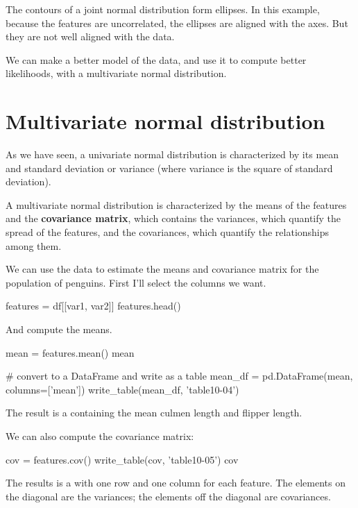 \documentclass[12pt]{book}
\theoremstyle{exercise}
\begin{document}
The contours of a joint normal distribution form ellipses.
In this example, because the features are uncorrelated, the ellipses are
aligned with the axes. But they are not well aligned with the data.

We can make a better model of the data, and use it to compute better
likelihoods, with a multivariate normal distribution.


\section{Multivariate normal distribution}
\label{multivariate-normal-distribution}

As we have seen, a univariate normal distribution is characterized by
its mean and standard deviation or variance (where variance is the
square of standard deviation).

A multivariate normal distribution is characterized by the means of the
features and the \textbf{covariance matrix}, which contains the
variances, which quantify the spread of the features, and the
covariances, which quantify the relationships among them.

We can use the data to estimate the means and covariance matrix for the
population of penguins. First I'll select the columns we want.

\begin{code}
features = df[[var1, var2]]
features.head()
\end{code}

And compute the means.

\begin{code}
mean = features.mean()
mean
\end{code}

\begin{code}
# convert to a DataFrame and write as a table
mean_df = pd.DataFrame(mean, columns=['mean'])
write_table(mean_df, 'table10-04')
\end{code}

The result is a  containing the mean
culmen length and flipper length.

We can also compute the covariance matrix:

\begin{code}
cov = features.cov()
write_table(cov, 'table10-05')
cov
\end{code}

The results is a  with one row and
one column for each feature. The elements on the diagonal are the
variances; the elements off the diagonal are covariances.
\end{document}
